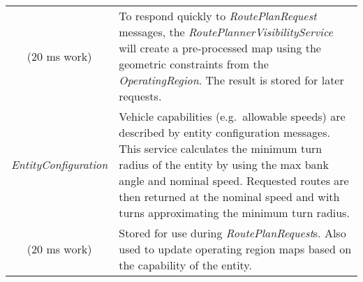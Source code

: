 \begin{longtable}[]{@{}cl@{}}
\begin{minipage}[t]{0.40\columnwidth}
(20 ms work)\strut
\end{minipage} & \begin{minipage}[t]{0.55\columnwidth}\raggedright\strut
To respond quickly to \emph{RoutePlanRequest} messages, the
\emph{RoutePlannerVisibilityService} will create a pre-processed map
using the geometric constraints from the \emph{OperatingRegion}. The
result is stored for later requests.\strut
\end{minipage}\tabularnewline
\begin{minipage}[t]{0.40\columnwidth}\centering\strut
\emph{EntityConfiguration}\strut
\end{minipage} & \begin{minipage}[t]{0.55\columnwidth}\raggedright\strut
Vehicle capabilities (e.g.~allowable speeds) are described by entity
configuration messages. This service calculates the minimum turn radius
of the entity by using the max bank angle and nominal speed. Requested
routes are then returned at the nominal speed and with turns
approximating the minimum turn radius.\strut
\end{minipage}\tabularnewline
\begin{minipage}[t]{0.40\columnwidth}\centering\strut
(20 ms work)\strut
\end{minipage} & \begin{minipage}[t]{0.55\columnwidth}\raggedright\strut
Stored for use during \emph{RoutePlanRequest}s. Also used to update
operating region maps based on the capability of the entity.\strut
\end{minipage}\tabularnewline
\bottomrule
\end{longtable}

